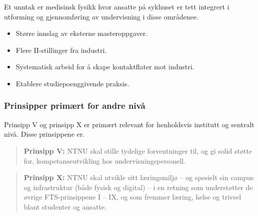 Et unntak er medisinsk fysikk hvor ansatte på sykhuset er tett integrert i utforming og gjennomføring av undervisning i disse områdenee.

\begin{itemize}
	\item Større innslag av eksterne masteroppgaver. 
	\item Flere II-stillinger fra industri.
	\item Systematisk arbeid for å skape kontaktflater mot industri.
	\item Etablere studiepoenggivende praksis.
\end{itemize}

\subsubsection{Prinsipper primært for andre nivå}

Prinsipp V og prinsipp X er primært relevant for henholdsvis institutt og sentralt nivå. Disse prinsippene er.

\begin{quote}
	\textbf{Prinsipp V:} NTNU skal stille tydelige forventninger til, og gi solid støtte for, kompetanseutvikling hos undervisningspersonell.
\end{quote}

\begin{quote}
	\textbf{Prinsipp X:} NTNU skal utvikle sitt læringsmiljø – og spesielt sin campus og infrastruktur (både fysisk og digital) – i en retning som understøtter de øvrige FTS-prinsippene I – IX, og som fremmer læring, helse og trivsel blant studenter og ansatte.
\end{quote}

